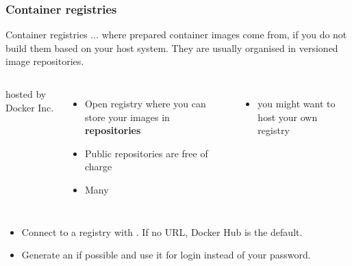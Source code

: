 \begin{frame}
	\frametitle{Container registries}
	\begin{block}{Container registries}
		... where prepared container images come from, if you do not build them based on your host system. They are usually organised in versioned image repositories.
	\end{block}
	\vspace{0.25cm}\begin{columns}[t]
		 hosted by Docker Inc.
		\begin{itemize}
			\item Open registry where you can store your images in \textbf{repositories}
			\item Public repositories are free of charge
			\item Many 
		\end{itemize}
		
		\begin{itemize}
			\item you might want to host your own registry
		\end{itemize}
	\end{columns}
    \vspace{0.5cm}\begin{itemize}
		\item Connect to a registry with . If no URL, Docker Hub is the default.
		\item Generate an  if possible and use it for login instead of your password.
	\end{itemize}
	
\end{frame}

